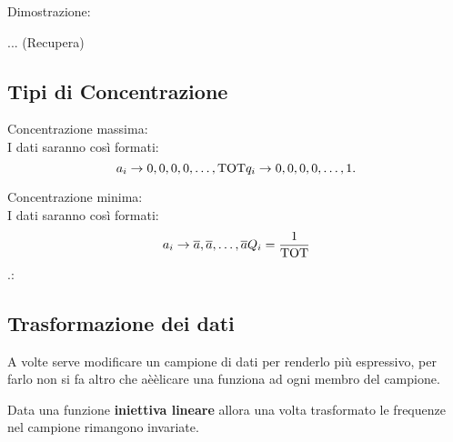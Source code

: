 \documentclass{article}
\begin{document}
\begin{tcolorbox}
   
  Dimostrazione:

  ... (Recupera)
    
\end{tcolorbox}

\subsection*{Tipi di Concentrazione}

Concentrazione massima: \\

I dati saranno così formati: $$a_i \to 0,0,0,0,\dots,\text{TOT}\\ q_i \to 0,0,0,0,\dots,1.$$ 

Concentrazione minima: \\

I dati saranno così formati: $$a_i \to \overline{a},\overline{a},\dots,\overline{a} \\ Q_i=\frac{1}{\text{TOT}}$$.:

\subsection*{Trasformazione dei dati}

A volte serve modificare un campione di dati per renderlo più espressivo, per farlo non si fa altro che aèèlicare una funziona ad ogni membro del campione.

Data una funzione \textbf{iniettiva lineare} allora una volta trasformato le frequenze nel campione rimangono invariate.
\end{document}
